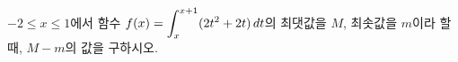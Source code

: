$-2\le x\le 1$에서 함수 $f(x)=\displaystyle\int_{x}^{x+1}(2t^2+2t)\mkern3mu dt$의 최댓값을 $M$, 최솟값을 $m$이라 할 때, $M-m$의 값을 구하시오.
